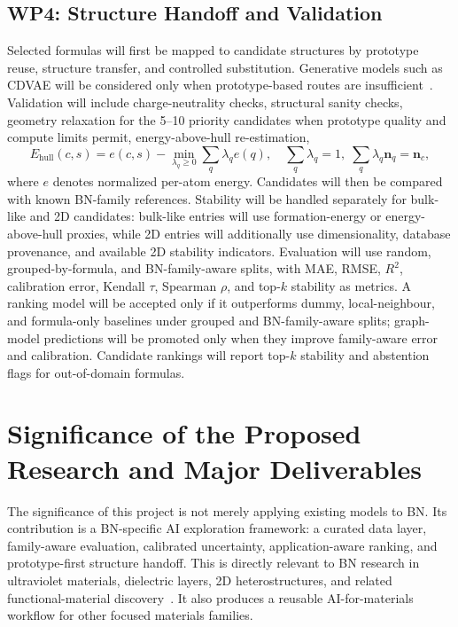 \documentclass[10pt,a4paper]{article}
\newcommand{\ehull}{E_{\mathrm{hull}}}
\begin{document}
\subsection{WP4: Structure Handoff and Validation}
Selected formulas will first be mapped to candidate structures by prototype reuse, structure transfer, and controlled substitution. Generative models such as CDVAE will be considered only when prototype-based routes are insufficient~\cite{xie2022_cdvae}. Validation will include charge-neutrality checks, structural sanity checks, geometry relaxation for the 5--10 priority candidates when prototype quality and compute limits permit, energy-above-hull re-estimation,
\[
  \ehull(c,s)=e(c,s)-
  \min_{\lambda_q\ge0}\sum_q\lambda_q e(q),
  \quad \sum_q\lambda_q=1,\;\sum_q\lambda_q\mathbf{n}_q=\mathbf{n}_c,
\]
where $e$ denotes normalized per-atom energy. Candidates will then be compared with known BN-family references. Stability will be handled separately for bulk-like and 2D candidates: bulk-like entries will use formation-energy or energy-above-hull proxies, while 2D entries will additionally use dimensionality, database provenance, and available 2D stability indicators. Evaluation will use random, grouped-by-formula, and BN-family-aware splits, with MAE, RMSE, $R^2$, calibration error, Kendall $\tau$, Spearman $\rho$, and top-$k$ stability as metrics. A ranking model will be accepted only if it outperforms dummy, local-neighbour, and formula-only baselines under grouped and BN-family-aware splits; graph-model predictions will be promoted only when they improve family-aware error and calibration. Candidate rankings will report top-$k$ stability and abstention flags for out-of-domain formulas.

\section{Significance of the Proposed Research and Major Deliverables}
The significance of this project is not merely applying existing models to BN. Its contribution is a BN-specific AI exploration framework: a curated data layer, family-aware evaluation, calibrated uncertainty, application-aware ranking, and prototype-first structure handoff. This is directly relevant to BN research in ultraviolet materials, dielectric layers, 2D heterostructures, and related functional-material discovery~\cite{watanabe2004_hbn_uv,cassabois2016_hbn_indirect,dean2010_hbn_graphene}. It also produces a reusable AI-for-materials workflow for other focused materials families.
\end{document}
